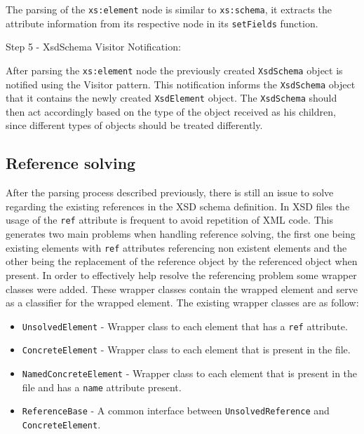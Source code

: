 \noindent
The parsing of the \texttt{xs:element} node is similar to \texttt{xs:schema}, it extracts the attribute information from its respective node in its \texttt{setFields} function. 

Step 5 - XsdSchema Visitor Notification:

\noindent
After parsing the \texttt{xs:element} node the previously created \texttt{XsdSchema} object is notified using the Visitor pattern. This notification informs the \texttt{XsdSchema} object that it contains the newly created \texttt{XsdElement} object. The \texttt{XsdSchema} should then act accordingly based on the type of the object received as his children, since different types of objects should be treated differently.

\subsection{Reference solving}
\label{sec:refsolving}

After the parsing process described previously, there is still an issue to solve regarding the existing references in the \ac{XSD} schema definition. In \ac{XSD} files the usage of the \texttt{ref} attribute is frequent to avoid repetition of \ac{XML} code. This generates two main problems when handling reference solving, the first one being existing elements with \texttt{ref} attributes referencing non existent elements and the other being the replacement of the reference object by the referenced object when present. In order to effectively help resolve the referencing problem some wrapper classes were added. These wrapper classes contain the wrapped element and serve as a classifier for the wrapped element. The existing wrapper classes are as follow:

\begin{itemize}  
	\item \texttt{UnsolvedElement} - Wrapper class to each element that has a \texttt{ref} attribute.
	\item \texttt{ConcreteElement} - Wrapper class to each element that is present in the file.
	\item \texttt{NamedConcreteElement} - Wrapper class to each element that is present in the file and has a \texttt{name} attribute present.
	\item \texttt{ReferenceBase} - A common interface between \texttt{UnsolvedReference} and \texttt{ConcreteElement}.
\end{itemize}

